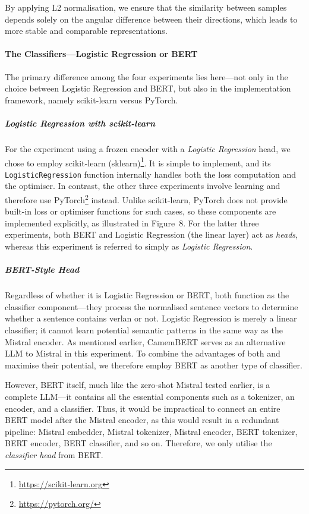 \documentclass[12pt]{article}
\begin{document}
By applying L2 normalisation, we ensure that the similarity between samples depends solely on the angular difference between their directions, which leads to more stable and comparable representations.

\paragraph{The Classifiers\;---\;Logistic Regression or BERT}
The primary difference among the four experiments lies here\;---\;not only in the choice between Logistic Regression and BERT, but also in the implementation framework, namely scikit-learn versus PyTorch.

\subparagraph{Logistic Regression with scikit-learn}
For the experiment using a frozen encoder with a \textit{Logistic Regression} head, we chose to employ scikit-learn (sklearn)\footnote{\url{https://scikit-learn.org}}. 
It is simple to implement, and its \texttt{LogisticRegression} function internally handles both the loss computation and the optimiser. 
In contrast, the other three experiments involve learning and therefore use PyTorch\footnote{\url{https://pytorch.org/}} instead. 
Unlike scikit-learn, PyTorch does not provide built-in loss or optimiser functions for such cases, so these components are implemented explicitly, as illustrated in Figure~8. 
For the latter three experiments, both BERT and Logistic Regression (the linear layer) act as \textit{heads}, whereas this experiment is referred to simply as \textit{Logistic Regression}.

\subparagraph{BERT-Style Head}
Regardless of whether it is Logistic Regression or BERT, both function as the classifier component\;---\;they process the normalised sentence vectors to determine whether a sentence contains verlan or not. 
Logistic Regression is merely a linear classifier; it cannot learn potential semantic patterns in the same way as the Mistral encoder. 
As mentioned earlier, CamemBERT serves as an alternative LLM to Mistral in this experiment. 
To combine the advantages of both and maximise their potential, we therefore employ BERT as another type of classifier.

However, BERT itself, much like the zero-shot Mistral tested earlier, is a complete LLM\;---\;it contains all the essential components such as a tokenizer, an encoder, and a classifier. 
Thus, it would be impractical to connect an entire BERT model after the Mistral encoder, as this would result in a redundant pipeline: Mistral embedder, Mistral tokenizer, Mistral encoder, BERT tokenizer, BERT encoder, BERT classifier, and so on. 
Therefore, we only utilise the \textit{classifier head} from BERT.
\end{document}
